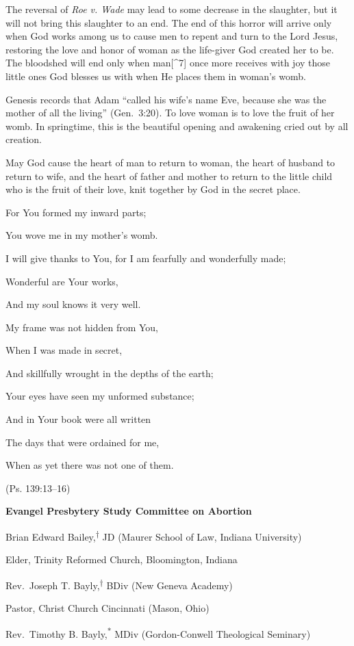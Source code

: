\documentclass[
]{book}
\begin{document}
The reversal of \emph{Roe v. Wade} may lead to some decrease in the slaughter, but it will not bring this slaughter to an end. The end of this horror will arrive only when God works among us to cause men to repent and turn to the Lord Jesus, restoring the love and honor of woman as the life-giver God created her to be. The bloodshed will end only when man{[}\^{}7{]} once more receives with joy those little ones God blesses us with when He places them in woman's womb.

Genesis records that Adam ``called his wife's name Eve, because she was the mother of all the living'' (Gen.~3:20). To love woman is to love the fruit of her womb. In springtime, this is the beautiful opening and awakening cried out by all creation.

May God cause the heart of man to return to woman, the heart of husband to return to wife, and the heart of father and mother to return to the little child who is the fruit of their love, knit together by God in the secret place.

For You formed my inward parts;

You wove me in my mother's womb.

I will give thanks to You, for I am fearfully and wonderfully made;

Wonderful are Your works,

And my soul knows it very well.

My frame was not hidden from You,

When I was made in secret,

And skillfully wrought in the depths of the earth;

Your eyes have seen my unformed substance;

And in Your book were all written

The days that were ordained for me,

When as yet there was not one of them.

(Ps. 139:13--16)

\textbf{Evangel Presbytery Study Committee on Abortion}

Brian Edward Bailey,\textsuperscript{†} JD (Maurer School of Law, Indiana University)

Elder, Trinity Reformed Church, Bloomington, Indiana

Rev.~Joseph T. Bayly,\textsuperscript{†} BDiv (New Geneva Academy)

Pastor, Christ Church Cincinnati (Mason, Ohio)

Rev.~Timothy B. Bayly,\textsuperscript{*} MDiv (Gordon-Conwell Theological Seminary)
\end{document}
